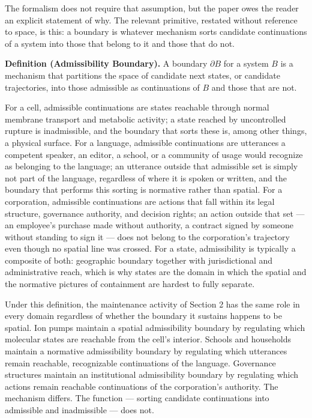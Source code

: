 \documentclass[11pt]{article}
\theoremstyle{plain}
\begin{document}
The formalism does not require that assumption, but the paper owes the reader an explicit statement of why. The relevant primitive, restated without reference to space, is this: a boundary is whatever mechanism sorts candidate continuations of a system into those that belong to it and those that do not.

\textbf{Definition (Admissibility Boundary).} A boundary \(\partial B\) for a system \(B\) is a mechanism that partitions the space of candidate next states, or candidate trajectories, into those admissible as continuations of \(B\) and those that are not.

For a cell, admissible continuations are states reachable through normal membrane transport and metabolic activity; a state reached by uncontrolled rupture is inadmissible, and the boundary that sorts these is, among other things, a physical surface. For a language, admissible continuations are utterances a competent speaker, an editor, a school, or a community of usage would recognize as belonging to the language; an utterance outside that admissible set is simply not part of the language, regardless of where it is spoken or written, and the boundary that performs this sorting is normative rather than spatial. For a corporation, admissible continuations are actions that fall within its legal structure, governance authority, and decision rights; an action outside that set --- an employee's purchase made without authority, a contract signed by someone without standing to sign it --- does not belong to the corporation's trajectory even though no spatial line was crossed. For a state, admissibility is typically a composite of both: geographic boundary together with jurisdictional and administrative reach, which is why states are the domain in which the spatial and the normative pictures of containment are hardest to fully separate.

Under this definition, the maintenance activity of Section 2 has the same role in every domain regardless of whether the boundary it sustains happens to be spatial. Ion pumps maintain a spatial admissibility boundary by regulating which molecular states are reachable from the cell's interior. Schools and households maintain a normative admissibility boundary by regulating which utterances remain reachable, recognizable continuations of the language. Governance structures maintain an institutional admissibility boundary by regulating which actions remain reachable continuations of the corporation's authority. The mechanism differs. The function --- sorting candidate continuations into admissible and inadmissible --- does not.
\end{document}
